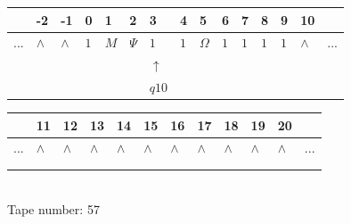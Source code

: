 \documentclass[11pt]{article}
\begin{document}
\begin{table}[H]
\centering
\begin{tabular}{lllllllllllllll}
 & -2 & -1 & 0 & 1 & 2 & 3 & 4 & 5 & 6 & 7 & 8 & 9 & 10 & \\
\hline
$...$ & \multicolumn{1}{|l|}{$\wedge$} & \multicolumn{1}{|l|}{$\wedge$} & \multicolumn{1}{|l|}{$1$} & \multicolumn{1}{|l|}{$M$} & \multicolumn{1}{|l|}{$\Psi$} & \multicolumn{1}{|l|}{$1$} & \multicolumn{1}{|l|}{$1$} & \multicolumn{1}{|l|}{$\Omega$} & \multicolumn{1}{|l|}{$1$} & \multicolumn{1}{|l|}{$1$} & \multicolumn{1}{|l|}{$1$} & \multicolumn{1}{|l|}{$1$} & \multicolumn{1}{|l|}{$\wedge$} & $...$\\
\hline
&  &  &  &  &  & $\uparrow$ &  &  &  &  &  &  &  &  \\
&  &  &  &  &  & $ q10 $ &  &  &  &  &  &  &  &  \\
\end{tabular}
\begin{tabular}{llllllllllll}
 & 11 & 12 & 13 & 14 & 15 & 16 & 17 & 18 & 19 & 20 & \\
\hline
$...$ & \multicolumn{1}{|l|}{$\wedge$} & \multicolumn{1}{|l|}{$\wedge$} & \multicolumn{1}{|l|}{$\wedge$} & \multicolumn{1}{|l|}{$\wedge$} & \multicolumn{1}{|l|}{$\wedge$} & \multicolumn{1}{|l|}{$\wedge$} & \multicolumn{1}{|l|}{$\wedge$} & \multicolumn{1}{|l|}{$\wedge$} & \multicolumn{1}{|l|}{$\wedge$} & \multicolumn{1}{|l|}{$\wedge$} & $...$\\
\hline
&  &  &  &  &  &  &  &  &  &  &  \\
&  &  &  &  &  &  &  &  &  &  &  \\
\end{tabular}
\\
Tape number: 57
\noindent\makebox[\linewidth]{\hdashrule{\textwidth}{1pt}{1pt}}\end{table}
\end{document}
